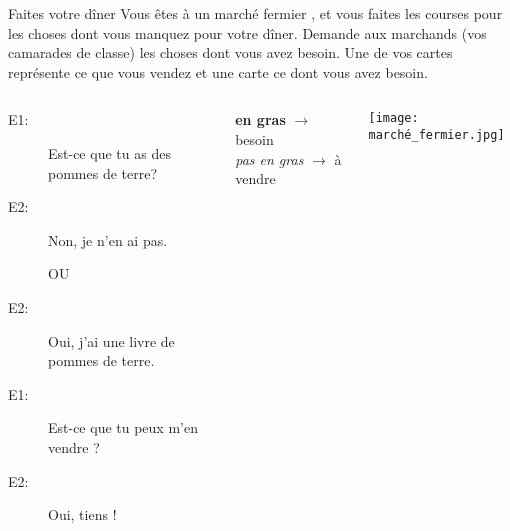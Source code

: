 \begin{frame}{Faites votre dîner}
  Vous êtes à un marché fermier , et vous faites les courses pour les choses dont vous manquez pour votre dîner.
  Demande aux marchands (vos camarades de classe) les choses dont vous avez besoin.
  Une de vos cartes représente ce que vous vendez et une carte ce dont vous avez besoin.
  \begin{columns}
      \small
      \begin{description}
        \item[E1:] Est-ce que tu as des pommes de terre?
        \item[E2:] Non, je n'en ai pas.
        \item[] OU
        \item[E2:] Oui, j'ai une livre de pommes de terre.
        \item[E1:] Est-ce que tu peux m'en vendre ?
        \item[E2:] Oui, tiens !
      \end{description}
      \textbf{en gras} $\to$ besoin \\ \emph{pas en gras} $\to$ à vendre
      \begin{center}
        \texttt{[image: marché\_fermier.jpg]}
      \end{center}
  \end{columns}
\end{frame}